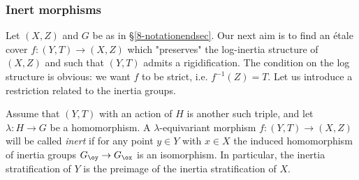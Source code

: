\documentclass[10pt]{../fichiers-configuration-latex/smfart}
\begin{document}
\subsubsection{Inert morphisms}\label{8-inertsec} Let $(X,Z)$
and $G$ be as in \S\ref{8-notationendsec}. Our next aim is to
find an \'etale cover $f:(Y,T)\to(X,Z)$ which "preserves" the
log-inertia structure of $(X,Z)$ and such that $(Y,T)$ admits a
rigidification. The condition on the log structure is obvious:
we want $f$ to be strict, i.e. $f^{-1}(Z)=T$. Let us introduce a
restriction related to the inertia groups.

Assume that $(Y,T)$ with an action of $H$ is another such triple,
and let $\lambda:H\to G$ be a homomorphism. A $\lambda$-equivariant
morphism $f{\colon}(Y,T)\to(X,Z)$ will be called {\em inert} if
for any point $y\in Y$ with $x\in X$ the induced homomorphism of
inertia groups $G_\oy\to G_\ox$ is an isomorphism. In particular,
the inertia stratification of $Y$ is the preimage of the inertia
stratification of $X$.
\end{document}
